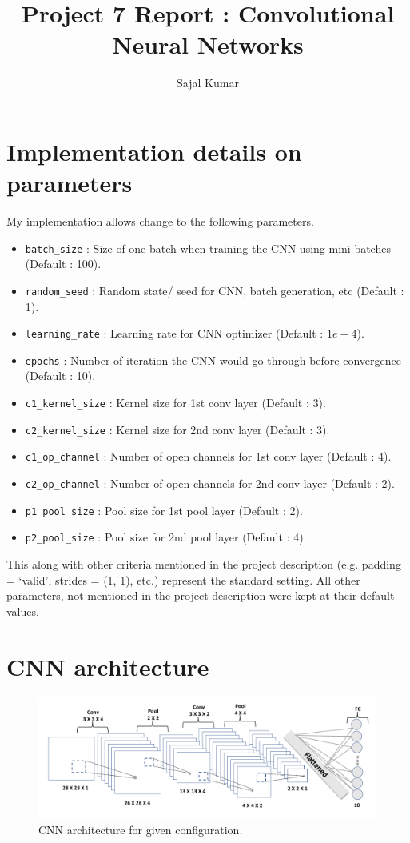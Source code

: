 \documentclass[12pt]{article}
\title{\textbf{Project 7 Report : Convolutional Neural Networks}}
\author{Sajal Kumar}
\date{}
\begin{document}
\maketitle

\section*{Implementation details on parameters}

My implementation allows change to the following parameters.

\begin{itemize}
\item \texttt{batch\_size} : Size of one batch when training the CNN using mini-batches (Default : 100).
\item \texttt{random\_seed} : Random state/ seed for CNN, batch generation, etc (Default : 1).
\item \texttt{learning\_rate} : Learning rate for CNN optimizer (Default : $1e-4$).
\item \texttt{epochs} : Number of iteration the CNN would go through before convergence (Default : 10).
\item \texttt{c1\_kernel\_size} : Kernel size for 1st conv layer (Default : 3).
\item \texttt{c2\_kernel\_size} : Kernel size for 2nd conv layer (Default : 3).
\item \texttt{c1\_op\_channel} : Number of open channels for 1st conv layer (Default : 4).
\item \texttt{c2\_op\_channel} : Number of open channels for 2nd conv layer (Default : 2).
\item \texttt{p1\_pool\_size} : Pool size for 1st pool layer (Default : 2).
\item \texttt{p2\_pool\_size} : Pool size for 2nd pool layer (Default : 4).
\end{itemize}

This along with other criteria mentioned in the project description (e.g. padding = `valid', strides = (1, 1), etc.) represent the standard setting. All other parameters, not mentioned in the project description were kept at their default values.

\section*{CNN architecture}

\begin{figure}
\includegraphics[width=\linewidth]{new_model_cnn_diag.pdf}
\caption{CNN architecture for given configuration.}
\label{fig-1}
\end{figure}
\end{document}
